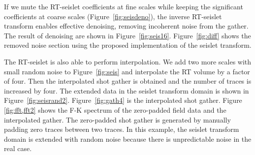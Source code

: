     If we mute the RT-seislet coefficients at fine scales while keeping the 
    significant coefficients at coarse scales (Figure~\ref{fig:seisdeno}), the 
    inverse RT-seislet transform enables effective denoising, removing 
    incoherent noise from the gather. 
    The result of denoising are shown in Figure~\ref{fig:seis16}. 
    Figure~\ref{fig:diff} shows the removed noise section using the proposed 
    implementation of the seislet transform.


    The RT-seislet is also able to perform interpolation. 
    We add two more scales with small random noise to Figure~\ref{fig:seis} and 
    interpolate the RT volume by a factor of four. 
    Then the interpolated shot gather is obtained and the number of traces is 
    increased by four. 
    The extended data in the seislet transform domain is shown in 
    Figure~\ref{fig:seisrand2}. 
    Figure~\ref{fig:gath4} is the interpolated shot gather. 
    Figure \ref{fig:fft,fft2} shows the F-K spectrum of the zero-padded 
    field data and the interpolated gather. 
    The zero-padded shot gather is generated by manually padding zero traces 
    between two traces.
    In this example, the seislet transform domain is extended with random noise 
    because there is unpredictable noise in the real case.


